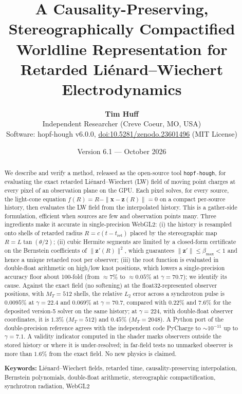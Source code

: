 \documentclass[11pt, a4paper]{article}
\title{\textbf{A Causality-Preserving, Stereographically Compactified Worldline Representation for Retarded Li\'enard--Wiechert Electrodynamics}}
\author{\textbf{Tim Huff} \\ \small Independent Researcher (Creve Coeur, MO, USA) \\ \small Software: hopf-hough v6.0.0, \href{https://doi.org/10.5281/zenodo.23601496}{doi:10.5281/zenodo.23601496} (MIT License)}
\date{Version 6.1 --- October 2026}
\begin{document}
\maketitle

\begin{abstract}
\noindent We describe and verify a method, released as the open-source tool \texttt{hopf-hough}, for evaluating the exact retarded Li\'enard--Wiechert (LW) field of moving point charges at every pixel of an observation plane on the GPU. Each pixel solves, for every source, the light-cone equation $f(R) = R - \|\mathbf{x} - \mathbf{z}(R)\| = 0$ on a compact per-source history, then evaluates the LW field from the interpolated history. This is a gather-side formulation, efficient when sources are few and observation points many. Three ingredients make it accurate in single-precision WebGL2: (i) the history is resampled onto shells of retarded radius $R = c(t - t_{\text{ret}})$ placed by the stereographic map $R = L\tan(\theta/2)$; (ii) cubic Hermite segments are limited by a closed-form certificate on the Bernstein coefficients of $\|\mathbf{z}'(R)\|^2$, which guarantees $\|\mathbf{z}'\| \le \beta_{\max} < 1$ and hence a unique retarded root per observer; (iii) the root function is evaluated in double-float arithmetic on high/low knot positions, which lowers a single-precision accuracy floor about 100-fold (from $\approx 7\%$ to $\approx 0.05\%$ at $\gamma = 70.7$); we identify its cause. Against the exact field (no softening) at the float32-represented observer positions, with $M_T = 512$ shells, the relative $L_2$ error across a synchrotron pulse is $0.0095\%$ at $\gamma = 22.4$ and $0.069\%$ at $\gamma = 70.7$, compared with $0.22\%$ and $7.6\%$ for the deposited version-5 solver on the same history; at $\gamma = 224$, with double-float observer coordinates, it is $1.3\%$ ($M_T = 512$) and $0.45\%$ ($M_T = 2048$). A Python port of the double-precision reference agrees with the independent code PyCharge to $\sim\!10^{-11}$ up to $\gamma = 7.1$. A validity indicator computed in the shader marks observers outside the stored history or where it is under-resolved; in far-field tests no unmarked observer is more than $1.6\%$ from the exact field. No new physics is claimed.

\vspace{0.15cm}
\noindent \textbf{Keywords:} Li\'enard--Wiechert fields, retarded time, causality-preserving interpolation, Bernstein polynomials, double-float arithmetic, stereographic compactification, synchrotron radiation, WebGL2
\end{abstract}
\end{document}
